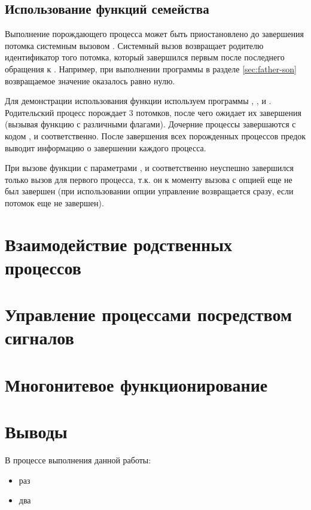 \subsection{Использование функций семейства }

Выполнение порождающего процесса может быть приостановлено до завершения потомка системным вызовом . Системный вызов  возвращает родителю идентификатор того потомка, который завершился первым после последнего обращения к . Например, при выполнении программы в разделе \ref{sec:father-son} возвращаемое значение оказалось равно нулю. 

Для демонстрации использования функции  используем программы , ,  и . Родительский процесс порождает 3 потомков, после чего ожидает их завершения (вызывая функцию  с различными флагами). Дочерние процессы завершаются с кодом ,  и  соответственно. После завершения всех порожденных процессов предок выводит информацию о завершении каждого процесса.









При вызове функции  с параметрами ,  и  соответственно неуспешно завершился только вызов  для первого процесса, т.к. он к моменту вызова  с опцией  еще не был завершен (при использовании опции  управление возвращается сразу, если потомок еще не завершен).


 

\section{Взаимодействие родственных процессов}

\section{Управление процессами посредством сигналов}

\section{Многонитевое функционирование}

\section{Выводы}

В процессе выполнения данной работы:
\begin{itemize}
	\item раз
	\item два
\end{itemize}



